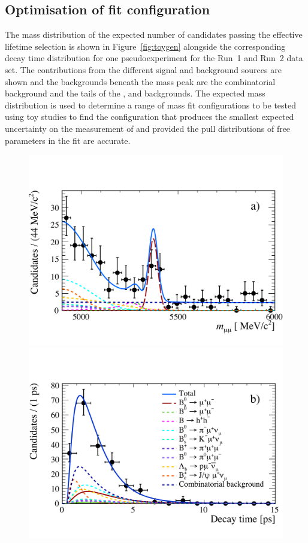 {\subsection{Optimisation of fit configuration}
\label{sec:toyresults}

The mass distribution of the expected number of \bsmumu candidates passing the effective lifetime selection is shown in Figure~\ref{fig:toygen} alongside the corresponding decay time distribution for one pseudoexperiment for the Run~1 and Run~2 data set. 
The contributions from the different signal and background sources are shown and the backgrounds beneath the \bs mass peak are the combinatorial background and the tails of the \bhh, \bdmumu and \lambdab backgrounds. The expected mass distribution is used to determine a range of mass fit configurations to be tested using toy studies to find the configuration that produces the smallest expected uncertainty on the measurement of \tmumu and \Gmumu provided the pull distributions of free parameters in the fit are accurate.


\begin{figure}[htbp]
    \centering
        \includegraphics[width= 0.8 \textwidth]{./Figs/LifetimeMeasurement/mass_pdf2.pdf}
        \includegraphics[width= 0.8 \textwidth]{./Figs/LifetimeMeasurement/DT_pdf2.pdf}
 

\end{figure}}
